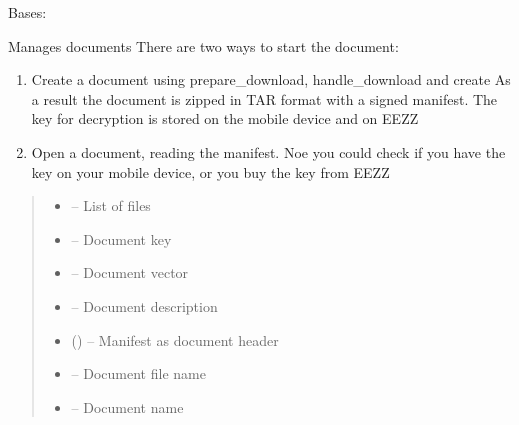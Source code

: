 \documentclass[letterpaper,10pt,english]{sphinxmanual}
\begin{document}
\begin{savenotes}
\begin{fulllineitems}
\pysigstopsignatures
\sphinxAtStartPar
Bases: 

\sphinxAtStartPar
Manages documents
There are two ways to start the document:
\begin{enumerate}
%
\item {} 
\sphinxAtStartPar
Create a document using prepare\_download, handle\_download and create
As a result the document is zipped in TAR format with a signed manifest. The key for decryption is stored on
the mobile device and on EEZZ

\item {} 
\sphinxAtStartPar
Open a document, reading the manifest. Noe you could check if you have the key on your mobile device, or you
buy the key from EEZZ

\end{enumerate}
\begin{quote}\begin{description}
\begin{itemize}
\item {} 
\sphinxAtStartPar
{} – List of files

\item {} 
\sphinxAtStartPar
{} – Document key

\item {} 
\sphinxAtStartPar
{} – Document vector

\item {} 
\sphinxAtStartPar
{} – Document description

\item {} 
\sphinxAtStartPar
{} ({\hyperref[\detokenize{eezz:eezz.document.TManifest}]{}}) – Manifest as document header

\item {} 
\sphinxAtStartPar
{} – Document file name

\item {} 
\sphinxAtStartPar
{} – Document name

\end{itemize}


\end{description}
\end{quote}
\end{fulllineitems}
\end{savenotes}
\end{document}
